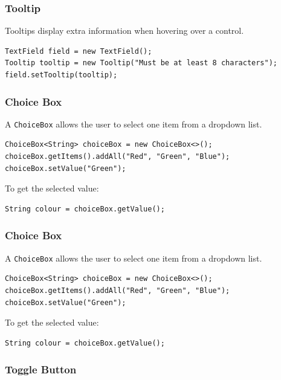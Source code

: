 \documentclass{article}
\newcommand{\codecmd}[1]{\textcolor[rgb]{0,0.5,0}{\texttt{#1}}}
\begin{document}
\subsubsection{Tooltip}

Tooltips display extra information when hovering over a control.

\begin{verbatim}
TextField field = new TextField();
Tooltip tooltip = new Tooltip("Must be at least 8 characters");
field.setTooltip(tooltip);
\end{verbatim}

\subsubsection{Choice Box}

A \codecmd{ChoiceBox} allows the user to select one item from a dropdown list.

\begin{verbatim}
ChoiceBox<String> choiceBox = new ChoiceBox<>();
choiceBox.getItems().addAll("Red", "Green", "Blue");
choiceBox.setValue("Green");
\end{verbatim}

\noindent To get the selected value:
\begin{verbatim}
String colour = choiceBox.getValue();
\end{verbatim}

\subsubsection{Choice Box}

A \codecmd{ChoiceBox} allows the user to select one item from a dropdown list.

\begin{verbatim}
ChoiceBox<String> choiceBox = new ChoiceBox<>();
choiceBox.getItems().addAll("Red", "Green", "Blue");
choiceBox.setValue("Green");
\end{verbatim}

\noindent To get the selected value:
\begin{verbatim}
String colour = choiceBox.getValue();
\end{verbatim}

\subsubsection{Toggle Button}
\end{document}
